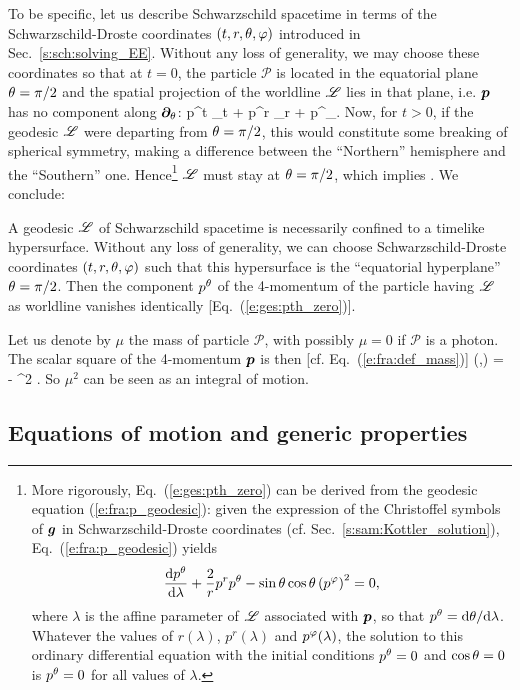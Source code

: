 To be specific, let us describe Schwarzschild spacetime in terms of the
Schwarzschild-Droste coordinates $(t,r,\theta,\varphi)$ introduced in Sec.~\ref{s:sch:solving_EE}.
Without any loss of generality, we may choose these coordinates so that
at $t=0$, the particle $\mathscr{P}$ is located in the equatorial plane $\theta=\pi/2$ and
the spatial projection of the worldline $\mathscr{L}$ lies in that plane, i.e. $\bm{p}$ has
no component along $\bm{\partial}_\theta$:
\be
      p^t \wpar_{t} + p^r \wpar_r + p^\ph \wpar_\ph .
\ee
Now, for $t>0$, if the geodesic $\mathscr{L}$ were departing from $\theta=\pi/2$, this
would constitute some breaking of spherical symmetry, making a difference
between the ``Northern'' hemisphere and the ``Southern'' one.
Hence\footnote{More rigorously, Eq.~(\ref{e:ges:pth_zero}) can
be derived from the geodesic equation (\ref{e:fra:p_geodesic}): given
the expression of the Christoffel symbols of $\bm{g}$ in Schwarzschild-Droste
coordinates (cf. Sec.~\ref{s:sam:Kottler_solution}), Eq.~(\ref{e:fra:p_geodesic})
yields \[\frac{\mathrm{d} p^\theta}{\mathrm{d}\lambda} +\frac{2}{r}  p^r p^\theta - \sin\theta\cos\theta \left( p^\varphi \right)^2 = 0,\] where $\lambda$ is the affine parameter of $\mathscr{L}$ associated with $\bm{p}$,
so that $p^\theta=\mathrm{d}\theta/\mathrm{d}\lambda$. Whatever the values of $r(\lambda)$,
$p^r(\lambda)$ and $p^\varphi(\lambda)$,
the solution to this ordinary differential equation with the initial conditions $p^\theta=0$ and
$\cos\theta=0$ is $p^\theta=0$ for all values of $\lambda$.} $\mathscr{L}$
must stay at $\theta=\pi/2$, which implies
\be \label{e:ges:pth_zero}
     .
\ee
We conclude:
\begin{prop}
A geodesic $\mathscr{L}$ of Schwarzschild spacetime is necessarily confined to a timelike hypersurface.
Without any loss of generality, we can choose Schwarzschild-Droste coordinates $(t,r,\theta,\varphi)$
such that this hypersurface is the ``equatorial hyperplane'' $\theta=\pi/2$.
Then the component $p^\theta$ of the 4-momentum of the particle having $\mathscr{L}$ as worldline
vanishes identically [Eq.~(\ref{e:ges:pth_zero})].
\end{prop}

Let us denote by $\mu$ the mass of particle $\mathscr{P}$, with possibly
$\mu=0$ if $\mathscr{P}$ is a photon. The scalar square of the 4-momentum $\bm{p}$ is
then [cf. Eq.~(\ref{e:fra:def_mass})]
\be \label{e:ges:p2_mu2}
    (,) = - \mu^2 .
\ee
So $\mu^2$ can be seen as an integral of motion.

\subsection{Equations of motion and generic properties} \label{s:ges:eq_to_be_solved}

